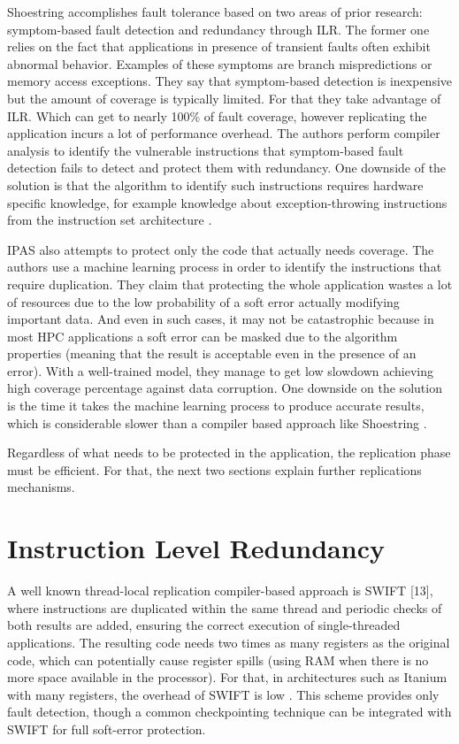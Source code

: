 Shoestring \cite{feng2010shoestring} accomplishes fault tolerance based on two areas of prior research: symptom-based fault detection and redundancy through ILR. The former one relies on the fact that applications in presence of transient faults often exhibit abnormal behavior. Examples of these symptoms are branch mispredictions or memory access exceptions. They say that symptom-based detection is inexpensive but the amount of coverage is typically limited. For that they take advantage of ILR. Which can get to nearly 100\% of fault coverage, however replicating the application incurs a lot of performance overhead. The authors perform compiler analysis to identify the vulnerable instructions that symptom-based fault detection fails to detect and protect them with redundancy. One downside of the solution is that the algorithm to identify such instructions requires hardware specific knowledge, for example knowledge about exception-throwing instructions from the instruction set architecture \cite{laguna2016ipas}.

IPAS \cite{laguna2016ipas} also attempts to protect only the code that actually needs coverage. The authors use a machine learning process in order to identify the instructions that require duplication. They claim that protecting the whole application wastes a lot of resources due to the low probability of a soft error actually modifying important data. And even in such cases, it may not be catastrophic because in most HPC applications a soft error can be masked due to the algorithm properties (meaning that the result is acceptable even in the presence of an error). With a well-trained model, they manage to get low slowdown achieving high coverage percentage against data corruption. One downside on the solution is the time it takes the machine learning process to produce accurate results, which is considerable slower than a compiler based approach like Shoestring \cite{feng2010shoestring}. 

Regardless of what needs to be protected in the application, the replication phase must be efficient. For that, the next two sections explain further replications mechanisms. 

\section{Instruction Level Redundancy}
\label{sec:InstructionLevelRedundancy}
A well known thread-local replication compiler-based approach is SWIFT [13], where instructions are duplicated within the same thread and periodic checks of both results are added, ensuring the correct execution of single-threaded applications. The resulting code needs two times as many registers as the original code, which can potentially cause register spills (using RAM when there is no more space available in the processor). For that, in architectures such as Itanium with many registers, the overhead of SWIFT is low \cite{zhang2012daft}. This scheme provides only fault detection, though a common checkpointing technique can be integrated with SWIFT for full soft-error protection. 

